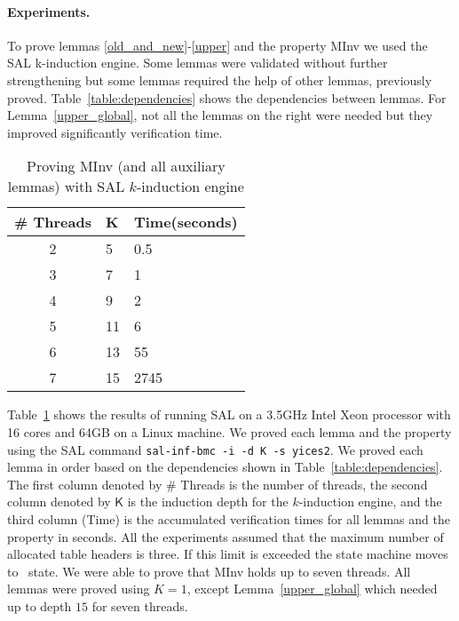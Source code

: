 \paragraph{Experiments.} To prove lemmas \ref{old_and_new}-\ref{upper} and the property \textsf{MInv} we used the SAL
k-induction engine. Some lemmas were validated without further
strengthening but some lemmas required the help of other lemmas,
previously proved. Table~\ref{table:dependencies} shows the
dependencies between lemmas. For Lemma~\ref{upper_global}, not all the
lemmas on the right were needed but they improved significantly
verification time.

\begin{table}[t]
  \begin{center}
    \begin{tabular}{|c|l|l|}
      \hline
      \textsf{\# Threads} & \textsf{K} & \textsf{Time(seconds)} \\
      \hline
      \hline           
      2 & 5  & 0.5\\
      \hline           
      3 & 7  & 1 \\
      \hline           
      4 & 9  & 2\\
      \hline           
      5 & 11 & 6 \\
      \hline           
      6 & 13 & 55 \\
      \hline           
      7 & 15 & 2745 \\      
      \hline 
    \end{tabular}
    \caption{Proving \textsf{MInv} (and all auxiliary lemmas) with SAL $k$-induction engine}
    \label{sal-results}
    \end{center}
\end{table}


Table~\ref{sal-results} shows the results of running SAL on a 3.5GHz
Intel Xeon processor with 16 cores and 64GB on a Linux machine. We
proved each lemma and the property using the SAL command
\texttt{sal-inf-bmc -i -d \textsf{K} -s yices2}. We proved each lemma in
order based on the dependencies shown in
Table~\ref{table:dependencies}.
%
The first column denoted by \textsf{\# Threads} is the number of
threads, the second column denoted by $\mathsf{K}$ is the induction
depth for the $k$-induction engine, and the third column
(\textsf{Time}) is the accumulated verification times for all lemmas
and the property in seconds. All the experiments assumed that the
maximum number of allocated table headers is three. If this limit is exceeded
the state machine moves to \pcthree\ state.
%
We were able to prove that \textsf{MInv} holds up to seven
threads. All lemmas were proved using $K=1$, except
Lemma~\ref{upper_global} which needed up to depth $15$ for seven
threads.
%




